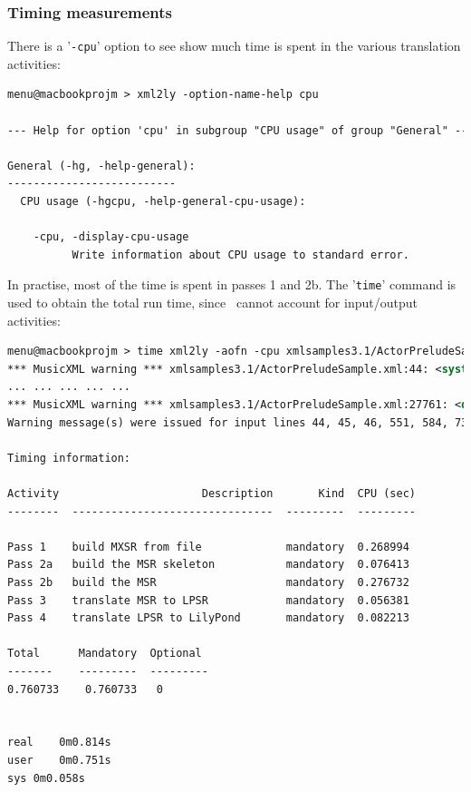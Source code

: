\documentclass[12pt,a4paper]{article}
\begin{document}
\subsubsection{Timing measurements}

There is a '{\tt -cpu}' option to see show much time is spent in the various translation activities:
\begin{lstlisting}[language=XML]
menu@macbookprojm > xml2ly -option-name-help cpu

--- Help for option 'cpu' in subgroup "CPU usage" of group "General" ---

General (-hg, -help-general):
--------------------------
  CPU usage (-hgcpu, -help-general-cpu-usage):

    -cpu, -display-cpu-usage
          Write information about CPU usage to standard error.
\end{lstlisting}

In practise, most of the time is spent in passes 1 and 2b. The '{\tt time}' command is used to obtain the total run time, since \xmlToLy\ cannot account for input/output activities:
\begin{lstlisting}[language=XML]
menu@macbookprojm > time xml2ly -aofn -cpu xmlsamples3.1/ActorPreludeSample.xml
*** MusicXML warning *** xmlsamples3.1/ActorPreludeSample.xml:44: <system-distance /> is not supported yet by xml2ly
... ... ... ... ...
*** MusicXML warning *** xmlsamples3.1/ActorPreludeSample.xml:27761: <direction/> contains 2 <words/> markups
Warning message(s) were issued for input lines 44, 45, 46, 551, 584, 732, 1121, 1215, 4724, 27761

Timing information:

Activity                      Description       Kind  CPU (sec)
--------  -------------------------------  ---------  ---------

Pass 1    build MXSR from file             mandatory  0.268994
Pass 2a   build the MSR skeleton           mandatory  0.076413
Pass 2b   build the MSR                    mandatory  0.276732
Pass 3    translate MSR to LPSR            mandatory  0.056381
Pass 4    translate LPSR to LilyPond       mandatory  0.082213

Total      Mandatory  Optional
-------    ---------  ---------
0.760733    0.760733   0


real	0m0.814s
user	0m0.751s
sys	0m0.058s
\end{lstlisting}
\end{document}
